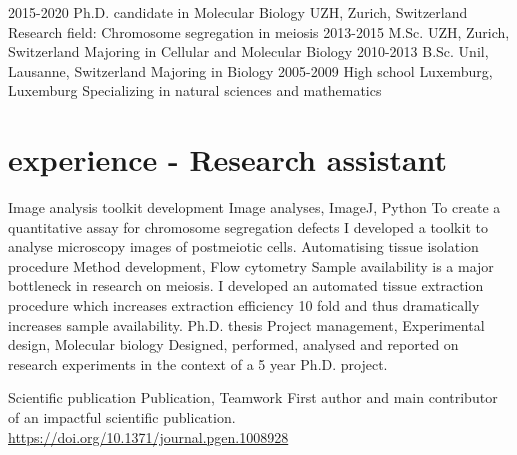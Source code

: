 \documentclass[]{twentysecondcv}
\begin{document}
\begin{twenty}
  \twentyitem
    {2015-2020}
    {Ph.D. {\normalfont candidate in Molecular Biology}}
    {UZH, Zurich, Switzerland}
    {Research field: Chromosome segregation in meiosis}
  \twentyitem
    {2013-2015}
    {M.Sc.}
    {UZH, Zurich, Switzerland}
    {Majoring in Cellular and Molecular Biology}
  \twentyitem
    {2010-2013}
    {B.Sc.}
    {Unil, Lausanne, Switzerland}
    {Majoring in Biology}
  \twentyitem
    {2005-2009}
    {High school}
    {Luxemburg, Luxemburg}
    {Specializing in natural sciences and mathematics}
\end{twenty}




\section{experience - Research assistant}

\begin{twentyO}
 
 \twentyOitem
    {Image analysis toolkit development}
    {Image analyses, ImageJ, Python}
    {To create a quantitative assay for chromosome segregation defects I developed a toolkit to analyse microscopy images of postmeiotic cells.}
\twentyOitem
    {Automatising tissue isolation procedure}
    {Method development, Flow cytometry}
    {Sample availability is a major bottleneck in research on meiosis. I developed an automated tissue extraction procedure which increases extraction efficiency 10 fold and thus dramatically increases sample availability.}
  \twentyOitem
    {Ph.D. thesis}
    {Project management, Experimental design, Molecular biology}
    {Designed, performed, analysed and reported on research experiments in the context of a 5 year Ph.D. project.}

  \twentyOitem
    {Scientific publication}
    {Publication, Teamwork}
    {First author and main contributor of an impactful scientific publication. \href{https://doi.org/10.1371/journal.pgen.1008928}{https://doi.org/10.1371/journal.pgen.1008928}}


\end{twentyO}
\end{document}
